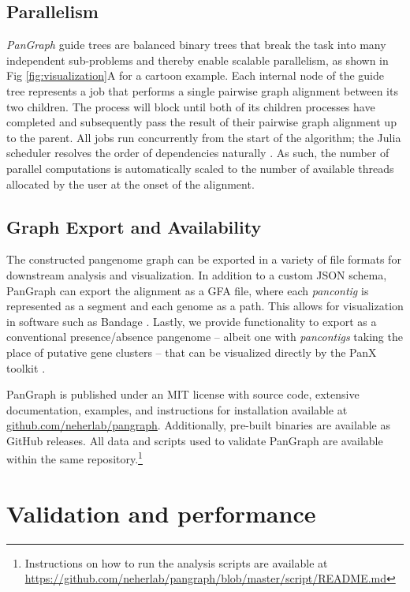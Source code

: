 \documentclass[aps,rmp,preprint,superscriptaddress,10pt,linenumbers]{revtex4-1}
\begin{document}
\subsection{Parallelism}
\emph{PanGraph} guide trees are balanced binary trees that break the task into many independent sub-problems and thereby enable scalable parallelism, as shown in Fig \ref{fig:visualization}A for a cartoon example.
Each internal node of the guide tree represents a job that performs a single pairwise graph alignment between its two children.
The process will block until both of its children processes have completed and subsequently pass the result of their pairwise graph alignment up to the parent.
All jobs run concurrently from the start of the algorithm; the Julia scheduler resolves the order of dependencies naturally \cite{bezanson2017julia}.
As such, the number of parallel computations is automatically scaled to the number of available threads allocated by the user at the onset of the alignment.

\subsection{Graph Export and Availability}
The constructed pangenome graph can be exported in a variety of file formats for downstream analysis and visualization.
In addition to a custom JSON schema, PanGraph can export the alignment as a GFA file, where each \emph{pancontig} is represented as a segment and each genome as a path.
This allows for visualization in software such as Bandage \cite{wick2015bandage}.
Lastly, we provide functionality to export as a conventional presence/absence pangenome {--} albeit one with \emph{pancontigs} taking the place of putative gene clusters {--} that can be visualized directly by the PanX toolkit \cite{ding2018panx}.

PanGraph is published under an MIT license with source code, extensive documentation, examples, and instructions for installation available at \url{github.com/neherlab/pangraph}.
Additionally, pre-built binaries are available as GitHub releases.
All data and scripts used to validate PanGraph are available within the same repository.\footnote{Instructions on how to run the analysis scripts are available at \url{https://github.com/neherlab/pangraph/blob/master/script/README.md}}

\section{Validation and performance}
\end{document}

